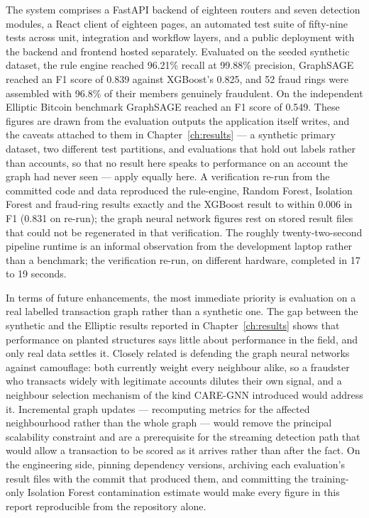 The system comprises a FastAPI backend of eighteen routers and seven detection modules, a React client of eighteen pages, an automated test suite of fifty-nine tests across unit, integration and workflow layers, and a public deployment with the backend and frontend hosted separately. Evaluated on the seeded synthetic dataset, the rule engine reached 96.21\% recall at 99.88\% precision, GraphSAGE reached an F1 score of 0.839 against XGBoost's 0.825, and 52 fraud rings were assembled with 96.8\% of their members genuinely fraudulent. On the independent Elliptic Bitcoin benchmark GraphSAGE reached an F1 score of 0.549. These figures are drawn from the evaluation outputs the application itself writes, and the caveats attached to them in Chapter~\ref{ch:results} --- a synthetic primary dataset, two different test partitions, and evaluations that hold out labels rather than accounts, so that no result here speaks to performance on an account the graph had never seen --- apply equally here. A verification re-run from the committed code and data reproduced the rule-engine, Random Forest, Isolation Forest and fraud-ring results exactly and the XGBoost result to within 0.006 in F1 (0.831 on re-run); the graph neural network figures rest on stored result files that could not be regenerated in that verification. The roughly twenty-two-second pipeline runtime is an informal observation from the development laptop rather than a benchmark; the verification re-run, on different hardware, completed in 17 to 19 seconds.

In terms of future enhancements, the most immediate priority is evaluation on a real labelled transaction graph rather than a synthetic one. The gap between the synthetic and the Elliptic results reported in Chapter~\ref{ch:results} shows that performance on planted structures says little about performance in the field, and only real data settles it. Closely related is defending the graph neural networks against camouflage: both currently weight every neighbour alike, so a fraudster who transacts widely with legitimate accounts dilutes their own signal, and a neighbour selection mechanism of the kind CARE-GNN introduced would address it. Incremental graph updates --- recomputing metrics for the affected neighbourhood rather than the whole graph --- would remove the principal scalability constraint and are a prerequisite for the streaming detection path that would allow a transaction to be scored as it arrives rather than after the fact. On the engineering side, pinning dependency versions, archiving each evaluation's result files with the commit that produced them, and committing the training-only Isolation Forest contamination estimate would make every figure in this report reproducible from the repository alone.

